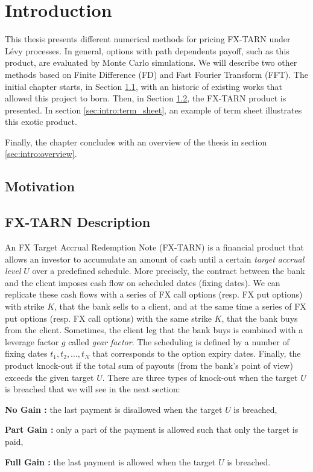\chapter{Introduction}
\label{sec:intro}


This thesis presents different numerical methods for pricing FX-TARN under L\'evy processes. In general, options with path dependents payoff, such as this product, are evaluated by Monte Carlo simulations. We will describe two other methods based on Finite Difference (FD) and Fast Fourier Transform (FFT). The initial chapter starts, in Section \ref{sec:intro:motivation}, with an historic of existing works that allowed this project to born. Then, in Section \ref{sec:intro:description}, the FX-TARN product is presented. In section \ref{sec:intro:term_sheet}, an example of term sheet illustrates this exotic product.

Finally, the chapter concludes with an overview of the thesis in section \ref{sec:intro:overview}.

\section{Motivation}
\label{sec:intro:motivation}

\section{FX-TARN Description}
\label{sec:intro:description}
An FX Target Accrual Redemption Note (FX-TARN) is a financial product that allows an investor to accumulate an amount of cash until a certain \textit{target accrual level} $U$ over a predefined schedule. More precisely, the contract between the bank and the client imposes cash flow on scheduled dates (fixing dates). We can replicate these cash flows with a series of FX call options (resp. FX put options) with strike $K$, that the bank sells to a client, and at the same time a series of FX put options (resp. FX call options) with the same strike $K$, that the bank buys from the client. Sometimes, the client leg that the bank buys is combined with a leverage factor $g$ called \textit{gear factor}. The scheduling is defined by a number of fixing dates $t_1,t_2,\ldots,t_N$ that corresponds to the option expiry dates. Finally, the product knock-out if the total sum of payouts (from the bank's point of view) exceeds the given target $U$. There are three types of knock-out when the target $U$ is breached that we will see in the next section:
\begin{my_list_item}
\item \textbf{No Gain :} the last payment is disallowed when the target $U$ is breached,
\item \textbf{Part Gain :} only a part of the payment is allowed such that only the target is paid,
\item \textbf{Full Gain :} the last payment is allowed when the target $U$ is breached. 
\end{my_list_item}

